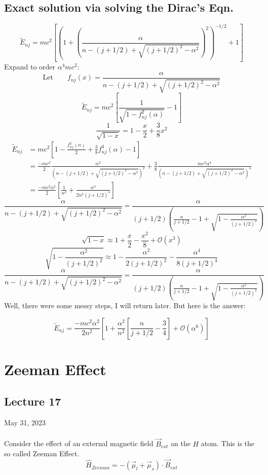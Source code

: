 \documentclass[12pt,fancychapters]{report}
\numberwithin{equation}{section}
\begin{document}
\section{Exact solution via solving the Dirac's Eqn.}
\[
  \tilde{E}_{nj} = mc^2 \left[\left(1+\left(\frac{\alpha}{n-(j+1/2)+\sqrt{(j+1/2)^2-\alpha^2
  } }\right)^2\right)^{-1/2}+1\right]
\]
Expand to order $\alpha^4mc^2$:\\
\[
  \text{Let}\qquad f_{nj}(x) =\frac{\alpha}{n-(j+1/2)+\sqrt{(j+1/2)^2-\alpha^2
  }}
\]
\[
  \tilde{E}_{nj} = mc^2\left[\frac{1}{\sqrt{1-f_{nj}^2(\alpha)}}-1\right]
\]
\[
  \frac{1}{\sqrt{1-x}} = 1 -\frac{x}{2}+\frac{3}{8}x^2
\]
\begin{align*}
  \tilde{E}_{nj} &= mc^2\left[1 -\frac{f_{nj}^2(\alpha)}{2}+\frac{3}{8}f_{nj}^4(\alpha) -1 \right]\\
&=\frac{-mc^2}{2}\frac{\alpha^2}{(n-(j+1/2)+\sqrt{(j+1/2)^2-\alpha^2})^2} +
\frac{3}{8}\frac{mc^2\alpha^4}{(n-(j+1/2)+\sqrt{(j+1/2)^2-\alpha^2})^4}\\
&= \frac{-mc^2\alpha^2}{2}\left[\frac{1}{n^2}+\frac{\alpha^4}{2n^2(j+1/2)^4}\right]
\end{align*}
\[
  \frac{\alpha}{n-(j+1/2)+\sqrt{(j+1/2)^2-\alpha^2}} = \frac{\alpha}{(j+1/2)\left(
  \frac{n}{j+1/2} - 1 + \sqrt{1- \frac{\alpha^2}{(j+1/2)^2}}\right)}
\]
\[
  \sqrt{1-x}\approx 1 + \frac{x}{2} - \frac{x^2}{8} +\mathcal{O}(x^3)
\]
\[
  \sqrt{1 -\frac{\alpha^2}{(j+1/2)^2} } \approx 1 - \frac{\alpha^2}{2(j+1/2)^2} - 
  \frac{\alpha^4}{8(j+1/2)^4}
\]
\[
 \frac{\alpha}{n-(j+1/2)+\sqrt{(j+1/2)^2-\alpha^2}}  = 
\frac{\alpha}{(j+1/2)\left(
  \frac{n}{j+1/2} - 1 + \sqrt{1- \frac{\alpha^2}{(j+1/2)^2}}\right)}
\]
Well, there were some messy steps, I will return later. But here is the answer: 

\[
  \boxed{\tilde{E}_{nj} = \frac{-mc^2\alpha^2}{2n^2} \left[1 + \frac{\alpha^2}{n^2}\left[
  \frac{n}{j+1/2} - \frac{3}{4}\right]+ \mathcal{O}(\alpha^6)\right]}
\]

\newpage
\chapter{Zeeman Effect}
\section{Lecture 17}
May 31, 2023\\
\\
Consider the effect of an external magnetic field $\vec{B}_{ext}$ an the $H$ atom. 
This is the so called Zeeman Effect.
\[
  \hat{H}_{Zeeman} = -(\vec{\mu}_l + \vec{\mu}_s)\cdot \vec{B}_{ext}
\]
\end{document}
